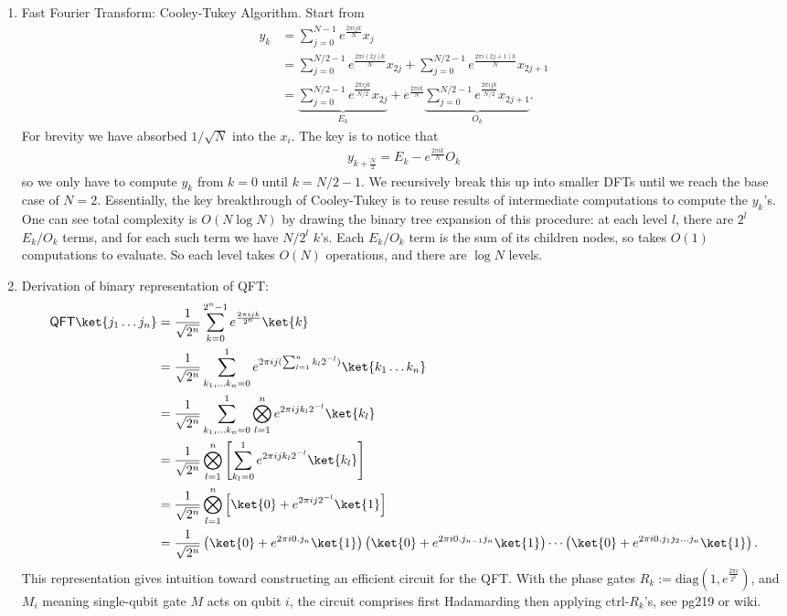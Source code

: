 \begin{enumerate}
    \item Fast Fourier Transform: Cooley-Tukey Algorithm. Start from 
    \begin{align*}
        y_k &= \sum_{j=0}^{N-1} e^{\frac{2\pi i jk}{N}} x_j\\
        &= \sum_{j=0}^{N/2-1} e^{\frac{2\pi i (2j)k}{N}} x_{2j} + \sum_{j=0}^{N/2-1} e^{\frac{2\pi i (2j+1)k}{N}} x_{2j+1}\\
        &= \underbrace{\sum_{j=0}^{N/2-1} e^{\frac{2\pi i jk}{N/2}} x_{2j}}_{E_k} + e^{\frac{2\pi ik}{N}}\underbrace{\sum_{j=0}^{N/2-1} e^{\frac{2\pi i jk}{N/2}} x_{2j+1}}_{O_k}.
    \end{align*}
    For brevity we have absorbed $1/\sqrt{N}$ into the $x_i$. The key is to notice that 
    \begin{align*}
        y_{k+\frac{N}{2}} = E_k - e^{\frac{2\pi ik}{N}}O_k
    \end{align*}
    so we only have to compute $y_k$ from $k=0$ until $k=N/2-1$. We recursively break this up into smaller DFTs until we reach the base case of $N=2$. Essentially, the key breakthrough of Cooley-Tukey is to reuse results of intermediate computations to compute the $y_k$'s. One can see total complexity is $O(N \log N)$ by drawing the binary tree expansion of this procedure: at each level $l$, there are $2^l$ $E_k/O_k$ terms, and for each such term we have $N/2^l$ $k$'s. Each $E_k/O_k$ term is the sum of its children nodes, so takes $O(1)$ computations to evaluate. So each level takes $O(N)$ operations, and there are $\log N$ levels.

    \item Derivation of binary representation of QFT:
    \begin{align*}
        \mathsf{QFT}\ket{j_1\dots j_n} &= \frac{1}{\sqrt{2^n}} \sum_{k=0}^{2^n-1} e^{\frac{2\pi ijk}{2^n}} \ket{k}\\
        &= \frac{1}{\sqrt{2^n}} \sum_{k_1,\dots k_n=0}^{1} e^{2\pi ij(\sum_{l=1}^n k_l 2^{-l})} \ket{k_1 \dots k_n}\\
        &= \frac{1}{\sqrt{2^n}} \sum_{k_1,\dots k_n=0}^{1} \bigotimes_{l=1}^n e^{2\pi ijk_l 2^{-l}} \ket{k_l}\\
        &= \frac{1}{\sqrt{2^n}} \bigotimes_{l=1}^n \left[\sum_{k_l=0}^{1} e^{2\pi ijk_l 2^{-l}} \ket{k_l}\right]\\
        &= \frac{1}{\sqrt{2^n}} \bigotimes_{l=1}^n \left[\ket{0} + e^{2\pi ij 2^{-l}} \ket{1}\right]\\
        &= \frac{1}{\sqrt{2^n}}\left( \ket{0}+e^{2\pi i0.j_n}\ket{1} \right)\left( \ket{0}+e^{2\pi i0.j_{n-1}j_n}\ket{1} \right)\cdots \left( \ket{0}+e^{2\pi i0.j_1j_2\dots j_n}\ket{1}\right).
    \end{align*}
    This representation gives intuition toward constructing an efficient circuit for the QFT. With the phase gates $R_k := \text{diag}(1,e^{\frac{2\pi i}{2^k}})$, and $M_i$ meaning single-qubit gate $M$ acts on qubit $i$, the circuit comprises first Hadamarding then applying ctrl-$R_k$'s, see \cite{NC10} pg219 or wiki.


\end{enumerate}
